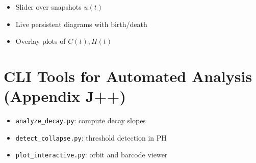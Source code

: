\documentclass[11pt]{article}
\begin{document}
\begin{itemize}
  \item Slider over snapshots \( u(t) \)
  \item Live persistent diagrams with birth/death
  \item Overlay plots of \( C(t), H(t) \)
\end{itemize}

\section{CLI Tools for Automated Analysis (Appendix J++)}

\begin{itemize}
  \item \texttt{analyze\_decay.py}: compute decay slopes
  \item \texttt{detect\_collapse.py}: threshold detection in PH
  \item \texttt{plot\_interactive.py}: orbit and barcode viewer
\end{itemize}
\end{document}
